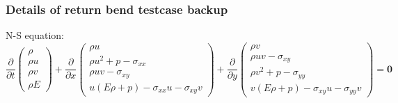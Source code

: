 \documentclass{beamer}
\begin{document}
\begin{frame}
    \frametitle{Details of return bend testcase \hfill \scriptsize{backup}}\scriptsize
    N-S equation:
    \begin{equation*}
        \frac{\partial}{\partial t}
        \begin{pmatrix}
            \rho \\ \rho u \\ \rho v\\ \rho E
        \end{pmatrix}
        + \frac{\partial}{\partial x} 
        \begin{pmatrix}
            \rho u\\
            \rho u^2 + p - \sigma_{xx}\\
            \rho uv - \sigma_{xy}\\
            u(E\rho+p) - \sigma_{xx} u - \sigma_{xy} v
        \end{pmatrix}
        + \frac{\partial}{\partial y}
        \begin{pmatrix}
            \rho v\\
            \rho uv-\sigma_{xy}\\
            \rho v^2+p-\sigma_{yy}\\
            v(E\rho+p) - \sigma_{xy} u -\sigma_{yy}v
        \end{pmatrix} 
        = \boldsymbol{0}
        \label{NSeqn}
    \end{equation*}


\end{frame}
\end{document}
